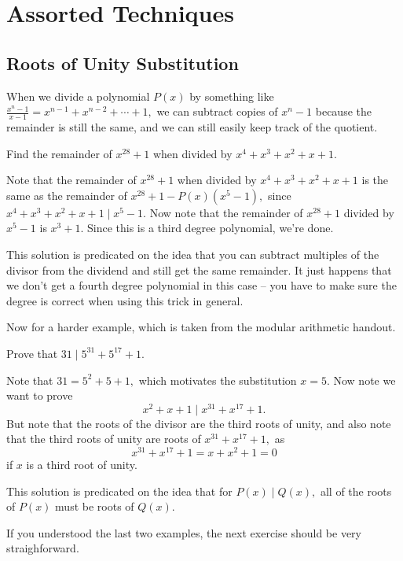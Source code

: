 \documentclass[mast]{lucky}
\begin{document}
\section{Assorted Techniques}

\subsection{Roots of Unity Substitution}
When we divide a polynomial $P(x)$ by something like $\frac{x^n-1}{x-1}=x^{n-1}+x^{n-2}+\cdots+1,$ we can subtract copies of $x^n-1$ because the remainder is still the same, and we can still easily keep track of the quotient.

\begin{exam}
Find the remainder of $x^{28}+1$ when divided by $x^4+x^3+x^2+x+1.$
\end{exam}

\begin{sol}
Note that the remainder of $x^{28}+1$ when divided by $x^4+x^3+x^2+x+1$ is the same as the remainder of $x^{28}+1-P(x)(x^5-1),$ since $x^4+x^3+x^2+x+1\mid x^5-1.$ Now note that the remainder of $x^{28}+1$ divided by $x^5-1$ is $x^3+1.$ Since this is a third degree polynomial, we're done.
\end{sol}
This solution is predicated on the idea that you can subtract multiples of the divisor from the dividend and still get the same remainder. It just happens that we don't get a fourth degree polynomial in this case -- you have to make sure the degree is correct when using this trick in general.

Now for a harder example, which is taken from the modular arithmetic handout.

\begin{exam}
Prove that $31\mid 5^{31}+5^{17}+1.$
\end{exam}

\begin{sol}
Note that $31=5^2+5+1,$ which motivates the substitution $x=5.$ Now note we want to prove
\[x^2+x+1\mid x^{31}+x^{17}+1.\]
But note that the roots of the divisor are the third roots of unity, and also note that the third roots of unity are roots of $x^{31}+x^{17}+1,$ as
\[x^{31}+x^{17}+1=x+x^2+1=0\]
if $x$ is a third root of unity.
\end{sol}
This solution is predicated on the idea that for $P(x)\mid Q(x),$ all of the roots of $P(x)$ must be roots of $Q(x).$

If you understood the last two examples, the next exercise should be very straighforward.
\end{document}
